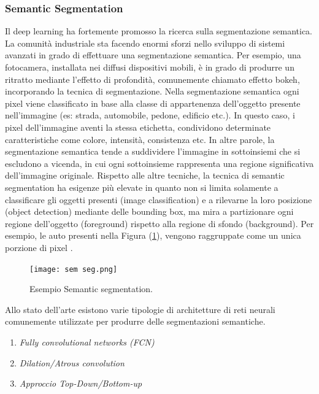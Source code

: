 \subsubsection{Semantic Segmentation}
Il deep learning ha fortemente promosso la ricerca sulla segmentazione semantica. 
La comunità industriale sta facendo enormi sforzi nello sviluppo di sistemi avanzati 
in grado di effettuare una segmentazione semantica. Per esempio, una fotocamera, 
installata nei diffusi dispositivi mobili, è in grado di produrre un ritratto mediante 
l’effetto di profondità, comunemente chiamato effetto bokeh, incorporando la tecnica 
di segmentazione. Nella segmentazione semantica ogni pixel viene classificato 
in base alla classe di appartenenza dell’oggetto presente nell’immagine (es: strada, 
automobile, pedone, edificio etc.). In questo caso, i pixel dell’immagine aventi la 
stessa etichetta, condividono determinate caratteristiche come colore, intensità, 
consistenza etc. In altre parole, la segmentazione semantica tende a suddividere 
l’immagine in sottoinsiemi che si escludono a vicenda, in cui ogni sottoinsieme 
rappresenta una regione significativa dell’immagine originale. Rispetto alle altre 
tecniche, la tecnica di semantic segmentation ha esigenze più elevate in quanto 
non si limita solamente a classificare gli oggetti presenti (image classification) e a 
rilevarne la loro posizione (object detection) mediante delle bounding box, ma 
mira a partizionare ogni regione dell’oggetto (foreground) rispetto alla regione 
di sfondo (background). Per esempio, le auto presenti nella Figura (\ref{semantic segmentation}), vengono 
raggruppate come un unica porzione di pixel \cite{aurelien}.
\begin{figure}[H]
    \centering
    \texttt{[image: sem seg.png]}
    \centering
    \caption{Esempio Semantic segmentation.}
    \label{semantic segmentation}
\end{figure}
Allo stato dell’arte esistono varie tipologie di architetture di reti neurali 
comunemente utilizzate per produrre delle segmentazioni semantiche.
\begin{enumerate}
    \item \emph{Fully convolutional networks (FCN)}
    \item \emph{Dilation/Atrous convolution}
    \item \emph{Approccio Top-Down/Bottom-up}
\end{enumerate}

